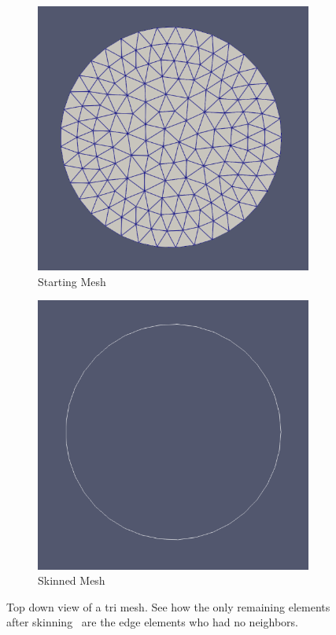 \documentclass[12pt, letterpaper]{article}
\begin{document}
\begin{figure}[ht]
	\begin{subfigure}{0.4\textwidth}
	    \includegraphics[width=\linewidth]{	processExample/circle.png}
	    \caption{Starting Mesh}
	\end{subfigure}
	\hspace*{\fill}	
	\begin{subfigure}{0.4\textwidth}
	    \includegraphics[width=\linewidth]{	processExample/skin.png}	   
   	    \caption{Skinned Mesh}
	\end{subfigure}
	\caption{Top down view of a tri mesh. See how the only remaining elements after skinning \
	are the edge elements who had no neighbors.}
	\label{2DSkinExample}
\end{figure}
\end{document}
